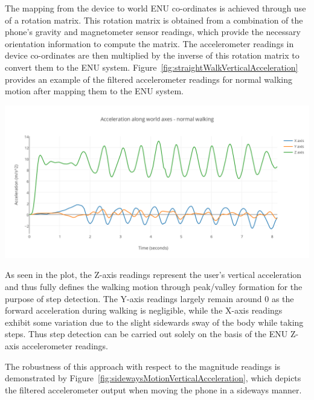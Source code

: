 \documentclass[12pt,a4paper,notitlepage]{report}
\begin{document}
The mapping from the device to world ENU co-ordinates is achieved through use of a rotation matrix. This rotation matrix is obtained from a combination of the phone's gravity and magnetometer sensor readings, which provide the necessary orientation information to compute the matrix. The accelerometer readings in device co-ordinates are then multiplied by the inverse of this rotation matrix to convert them to the ENU system. Figure~\ref{fig:straightWalkVerticalAcceleration} provides an example of the filtered accelerometer readings for normal walking motion after mapping them to the ENU system. 

\begin{center}
\includegraphics[scale=0.9]{images/straightWalkVerticalAcceleration.png}
\label{fig:straightWalkVerticalAcceleration}
\end{center}
As seen in the plot, the Z-axis readings represent the user's vertical acceleration and thus fully defines the walking motion through peak/valley formation for the purpose of step detection. The Y-axis readings largely remain around 0 as the forward acceleration during walking is negligible, while the X-axis readings exhibit some variation due to the slight sidewards sway of the body while taking steps. Thus step detection can be carried out solely on the basis of the ENU Z-axis accelerometer readings.  

The robustness of this approach with respect to the magnitude readings is demonstrated by Figure~\ref{fig:sidewaysMotionVerticalAcceleration}, which depicts the filtered accelerometer output when moving the phone in a sideways manner.  
\end{document}
